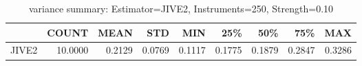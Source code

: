 \begin{table}[ht]
\centering
\caption{variance summary: Estimator=JIVE2, Instruments=250, Strength=0.10}
\begin{tabular}{lrrrrrrrr}
\toprule
 & COUNT & MEAN & STD & MIN & 25\% & 50\% & 75\% & MAX \\
\midrule
JIVE2 & 10.0000 & 0.2129 & 0.0769 & 0.1117 & 0.1775 & 0.1879 & 0.2847 & 0.3286 \\
\bottomrule
\end{tabular}
\end{table}

